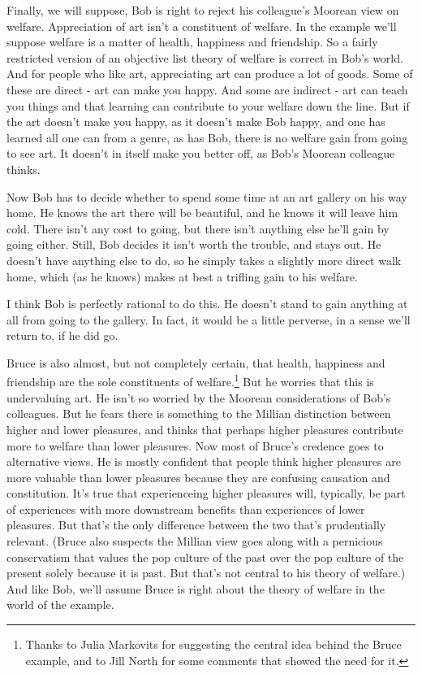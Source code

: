 Finally, we will suppose, Bob is right to reject his colleague's Moorean view on welfare. Appreciation of art isn't a constituent of welfare. In the example we'll suppose welfare is a matter of health, happiness and friendship. So a fairly restricted version of an objective list theory of welfare is correct in Bob's world. And for people who like art, appreciating art can produce a lot of goods. Some of these are direct - art can make you happy. And some are indirect - art can teach you things and that learning can contribute to your welfare down the line. But if the art doesn't make you happy, as it doesn't make Bob happy, and one has learned all one can from a genre, as has Bob, there is no welfare gain from going to see art. It doesn't in itself make you better off, as Bob's Moorean colleague thinks.

Now Bob has to decide whether to spend some time at an art gallery on his way home. He knows the art there will be beautiful, and he knows it will leave him cold. There isn't any cost to going, but there isn't anything else he'll gain by going either. Still, Bob decides it isn't worth the trouble, and stays out. He doesn't have anything else to do, so he simply takes a slightly more direct walk home, which (as he knows) makes at best a trifling gain to his welfare.

I think Bob is perfectly rational to do this. He doesn't stand to gain anything at all from going to the gallery. In fact, it would be a little perverse, in a sense we'll return to, if he did go.

Bruce is also almost, but not completely certain, that health, happiness and friendship are the sole constituents of welfare.\footnote{Thanks to Julia Markovits for suggesting the central idea behind the Bruce example, and to Jill North for some comments that showed the need for it.} But he worries that this is undervaluing art. He isn't so worried by the Moorean considerations of Bob's colleagues. But he fears there is something to the Millian distinction between higher and lower pleasures, and thinks that perhaps higher pleasures contribute more to welfare than lower pleasures. Now most of Bruce's credence goes to alternative views. He is mostly confident that people think higher pleasures are more valuable than lower pleasures because they are confusing causation and constitution. It's true that experienceing higher pleasures will, typically, be part of experiences with more downstream benefits than experiences of lower pleasures. But that's the only difference between the two that's prudentially relevant. (Bruce also suspects the Millian view goes along with a pernicious conservatism that values the pop culture of the past over the pop culture of the present solely because it is past. But that's not central to his theory of welfare.) And like Bob, we'll assume Bruce is right about the theory of welfare in the world of the example.

